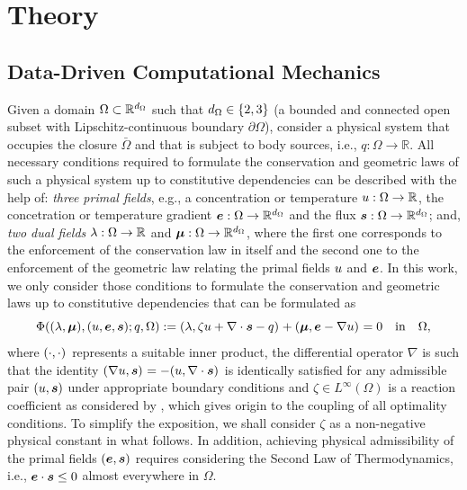 
\section{Theory}

\subsection{Data-Driven Computational Mechanics}

Given a domain $\Omega\subset\mathbb{R}^\dimo$ such that $\dimo\in\{2,3\}$ (a bounded and connected open subset with Lipschitz-continuous boundary $\partial\Omega$), consider a physical system that occupies the closure $\bar{\Omega}$ and that is subject to body sources, i.e., $q:\Omega\to\mathbb{R}$. All necessary conditions required to formulate the conservation and geometric laws of such a physical system up to constitutive dependencies can be described with the help of: \textit{three primal fields}, e.g., a concentration or temperature $\uF:\Omega\to\mathbb{R}$, the concetration or temperature gradient $\eF:\Omega\to\mathbb{R}^\dimo$ and the flux $\sF:\Omega\to\mathbb{R}^\dimo$; and, \textit{two dual fields} $\lF:\Omega\to\mathbb{R}$ and $\mF:\Omega\to\mathbb{R}^\dimo$, where the first one corresponds to the enforcement of the conservation law in itself and the second one to the enforcement of the geometric law relating the primal fields $\uF$ and $\eF$. In this work, we only consider those conditions to formulate the conservation and geometric laws up to constitutive dependencies that can be formulated as
$$
\Phi((\lF,\mF),(\uF,\eF,\sF);q,\Omega) :=
\iprod[]{\lF}{\zeta\uF+\nabla\cdot\sF-q}+
\iprod[]{\mF}{\eF-\nabla\uF} = 0 \quad\mathrm{in}\quad\Omega,
$$
where $\iprod[]{\cdot}{\cdot}$ represents a suitable inner product, the differential operator $\nabla$ is such that the identity $\iprod[]{\nabla\uF}{\sF} = - \iprod[]{\uF}{\nabla\cdot\sF}$ is identically satisfied for any admissible pair $(\uF,\sF)$ under appropriate boundary conditions \cite[Thm. 6.2]{Kurula_Zwart:2012} and $\zeta\in L^\infty(\Omega)$ is a reaction coefficient as considered by \cite{Balbao2025}, which gives origin to the coupling of all optimality conditions. To simplify the exposition, we shall consider $\zeta$ as a non-negative physical constant in what follows. In addition, achieving physical admissibility of the primal fields $(\eF,\sF)$ requires considering the Second Law of Thermodynamics, i.e., $\eF\cdot\sF\leq 0$ almost everywhere in $\Omega$. 

